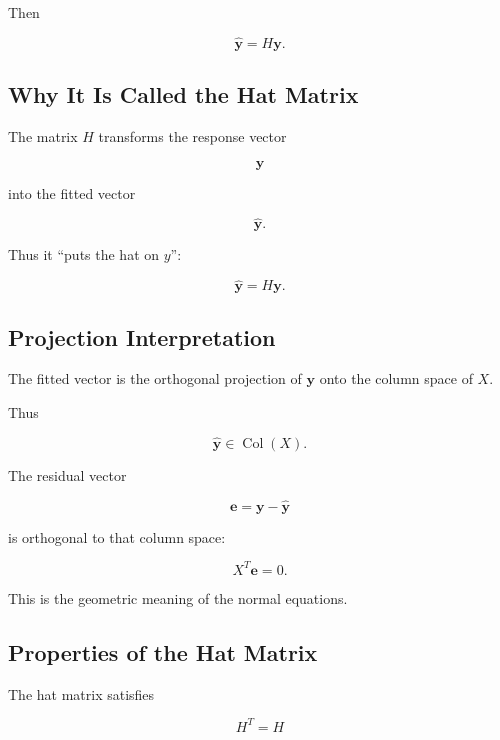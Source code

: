 Then

\[
\boxed{
\widehat{\mathbf{y}}
=
H\mathbf{y}.
}
\]

\subsection{Why It Is Called the Hat Matrix}
\label{subsec:hat-matrix-name}

The matrix \(H\) transforms the response vector

\[
\mathbf{y}
\]

into the fitted vector

\[
\widehat{\mathbf{y}}.
\]

Thus it ``puts the hat on \(y\)'':

\[
\boxed{
\widehat{\mathbf{y}}
=
H\mathbf{y}.
}
\]

\subsection{Projection Interpretation}
\label{subsec:projection-interpretation-regression}

The fitted vector is the orthogonal projection of \(\mathbf{y}\) onto
the column space of \(X\).

Thus

\[
\boxed{
\widehat{\mathbf{y}}
\in
\operatorname{Col}(X).
}
\]

The residual vector

\[
\mathbf{e}
=
\mathbf{y}
-
\widehat{\mathbf{y}}
\]

is orthogonal to that column space:

\[
\boxed{
X^T\mathbf{e}
=
0.
}
\]

This is the geometric meaning of the normal equations.

\subsection{Properties of the Hat Matrix}
\label{subsec:hat-matrix-properties}

The hat matrix satisfies

\[
\boxed{
H^T=H
}
\]

